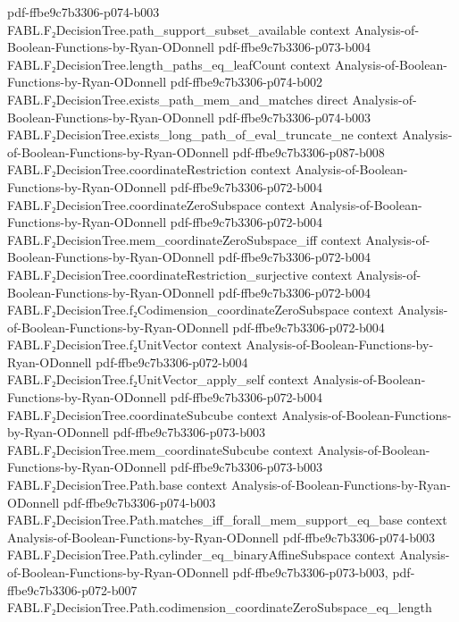\begin{theorem}
  {pdf-ffbe9c7b3306-p074-b003}
\proofstep
  {FABL.F₂DecisionTree.path_support_subset_available}
  {context}
  {Analysis-of-Boolean-Functions-by-Ryan-ODonnell}
  {pdf-ffbe9c7b3306-p073-b004}
\proofstep
  {FABL.F₂DecisionTree.length_paths_eq_leafCount}
  {context}
  {Analysis-of-Boolean-Functions-by-Ryan-ODonnell}
  {pdf-ffbe9c7b3306-p074-b002}
\proofstep
  {FABL.F₂DecisionTree.exists_path_mem_and_matches}
  {direct}
  {Analysis-of-Boolean-Functions-by-Ryan-ODonnell}
  {pdf-ffbe9c7b3306-p074-b003}
\proofstep
  {FABL.F₂DecisionTree.exists_long_path_of_eval_truncate_ne}
  {context}
  {Analysis-of-Boolean-Functions-by-Ryan-ODonnell}
  {pdf-ffbe9c7b3306-p087-b008}
\proofstep
  {FABL.F₂DecisionTree.coordinateRestriction}
  {context}
  {Analysis-of-Boolean-Functions-by-Ryan-ODonnell}
  {pdf-ffbe9c7b3306-p072-b004}
\proofstep
  {FABL.F₂DecisionTree.coordinateZeroSubspace}
  {context}
  {Analysis-of-Boolean-Functions-by-Ryan-ODonnell}
  {pdf-ffbe9c7b3306-p072-b004}
\proofstep
  {FABL.F₂DecisionTree.mem_coordinateZeroSubspace_iff}
  {context}
  {Analysis-of-Boolean-Functions-by-Ryan-ODonnell}
  {pdf-ffbe9c7b3306-p072-b004}
\proofstep
  {FABL.F₂DecisionTree.coordinateRestriction_surjective}
  {context}
  {Analysis-of-Boolean-Functions-by-Ryan-ODonnell}
  {pdf-ffbe9c7b3306-p072-b004}
\proofstep
  {FABL.F₂DecisionTree.f₂Codimension_coordinateZeroSubspace}
  {context}
  {Analysis-of-Boolean-Functions-by-Ryan-ODonnell}
  {pdf-ffbe9c7b3306-p072-b004}
\proofstep
  {FABL.F₂DecisionTree.f₂UnitVector}
  {context}
  {Analysis-of-Boolean-Functions-by-Ryan-ODonnell}
  {pdf-ffbe9c7b3306-p072-b004}
\proofstep
  {FABL.F₂DecisionTree.f₂UnitVector_apply_self}
  {context}
  {Analysis-of-Boolean-Functions-by-Ryan-ODonnell}
  {pdf-ffbe9c7b3306-p072-b004}
\proofstep
  {FABL.F₂DecisionTree.coordinateSubcube}
  {context}
  {Analysis-of-Boolean-Functions-by-Ryan-ODonnell}
  {pdf-ffbe9c7b3306-p073-b003}
\proofstep
  {FABL.F₂DecisionTree.mem_coordinateSubcube}
  {context}
  {Analysis-of-Boolean-Functions-by-Ryan-ODonnell}
  {pdf-ffbe9c7b3306-p073-b003}
\proofstep
  {FABL.F₂DecisionTree.Path.base}
  {context}
  {Analysis-of-Boolean-Functions-by-Ryan-ODonnell}
  {pdf-ffbe9c7b3306-p074-b003}
\proofstep
  {FABL.F₂DecisionTree.Path.matches_iff_forall_mem_support_eq_base}
  {context}
  {Analysis-of-Boolean-Functions-by-Ryan-ODonnell}
  {pdf-ffbe9c7b3306-p074-b003}
\proofstep
  {FABL.F₂DecisionTree.Path.cylinder_eq_binaryAffineSubspace}
  {context}
  {Analysis-of-Boolean-Functions-by-Ryan-ODonnell}
  {pdf-ffbe9c7b3306-p073-b003,
    pdf-ffbe9c7b3306-p072-b007}
\proofstep
  {FABL.F₂DecisionTree.Path.codimension_coordinateZeroSubspace_eq_length}

\end{theorem}
